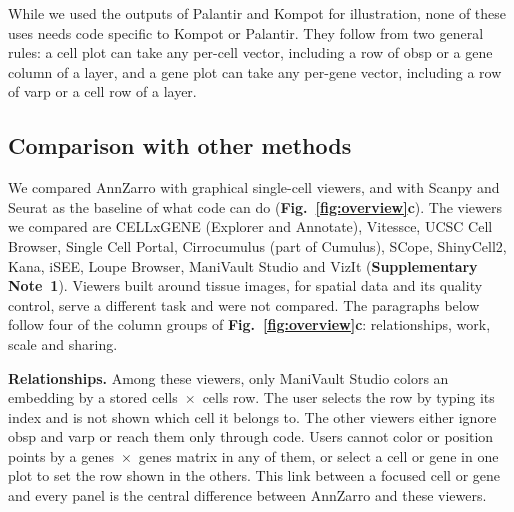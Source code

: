 \figfocusrow
\figgenegene
\figcellgene

While we used the outputs of Palantir and Kompot for illustration, none of these uses needs code specific to Kompot or Palantir. They follow from two general rules: a cell plot can take any per-cell vector, including a row of obsp or a gene column of a layer, and a gene plot can take any per-gene vector, including a row of varp or a cell row of a layer.

\subsection{Comparison with other methods}

We compared AnnZarro with graphical single-cell viewers, and with Scanpy and Seurat as the baseline of what code can do (\textbf{Fig.~\ref{fig:overview}c}). The viewers we compared are CELLxGENE (Explorer and Annotate)\cite{megill2021,czi2025}, Vitessce\cite{keller2025}, UCSC Cell Browser\cite{speir2021}, Single Cell Portal\cite{tarhan2023scp}, Cirrocumulus (part of Cumulus\cite{li2020cumulus}), SCope\cite{davie2018scope}, ShinyCell2\cite{ouyang2021,chen2025shinycell2}, Kana\cite{lun2023kana}, iSEE\cite{ruealbrecht2018}, Loupe Browser, ManiVault Studio\cite{vieth2023manivault} and VizIt (\textbf{Supplementary Note~1}).  Viewers built around tissue images, for spatial data and its quality control, serve a different task and were not compared. The paragraphs below follow four of the column groups of \textbf{Fig.~\ref{fig:overview}c}: relationships, work, scale and sharing.

\textbf{Relationships.} Among these viewers, only ManiVault Studio colors an embedding by a stored cells~$\times$~cells row. The user selects the row by typing its index and is not shown which cell it belongs to. The other viewers either ignore obsp and varp or reach them only through code. Users cannot color or position points by a genes~$\times$~genes matrix in any of them, or select a cell or gene in one plot to set the row shown in the others. This link between a focused cell or gene and every panel is the central difference between AnnZarro and these viewers.


